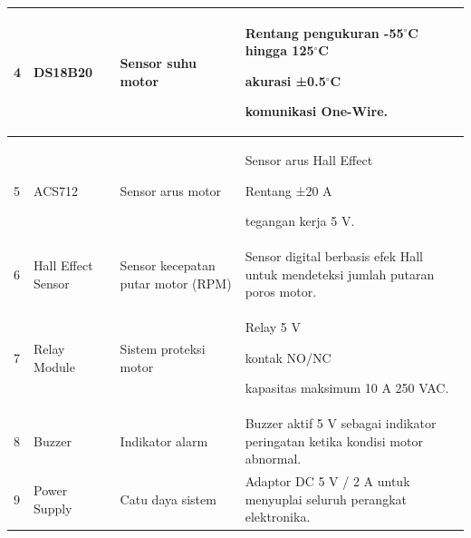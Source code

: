 \documentclass{elsinta}
\begin{document}
\begin{longtable} {|p{1cm}|p{3cm}|p{3cm}|p{6cm}|}
    4 &
    DS18B20 &
    Sensor suhu motor &
    Rentang pengukuran -55$^\circ$C hingga 125$^\circ$C
    
    akurasi ±0.5$^\circ$C
    
    komunikasi One-Wire. \\
    \hline
    
    5 &
    ACS712 &
    Sensor arus motor &
    Sensor arus Hall Effect
    
    Rentang ±20 A
    
    tegangan kerja 5 V. \\
    \hline
    
    6 &
    Hall Effect Sensor &
    Sensor kecepatan putar motor (RPM) &
    Sensor digital berbasis efek Hall untuk mendeteksi jumlah putaran poros motor. \\
    \hline
    
    7 &
    Relay Module &
    Sistem proteksi motor &
    Relay 5 V
    
    kontak NO/NC
    
    kapasitas maksimum 10 A 250 VAC. \\
    \hline
    
    8 &
    Buzzer &
    Indikator alarm &
    Buzzer aktif 5 V sebagai indikator peringatan ketika kondisi motor abnormal. \\
    \hline
    
    9 &
    Power Supply &
    Catu daya sistem &
    Adaptor DC 5 V / 2 A untuk menyuplai seluruh perangkat elektronika. \\
    \hline
\end{longtable}

\subsection{\SoftwareSpecTitle}


\end{document}
